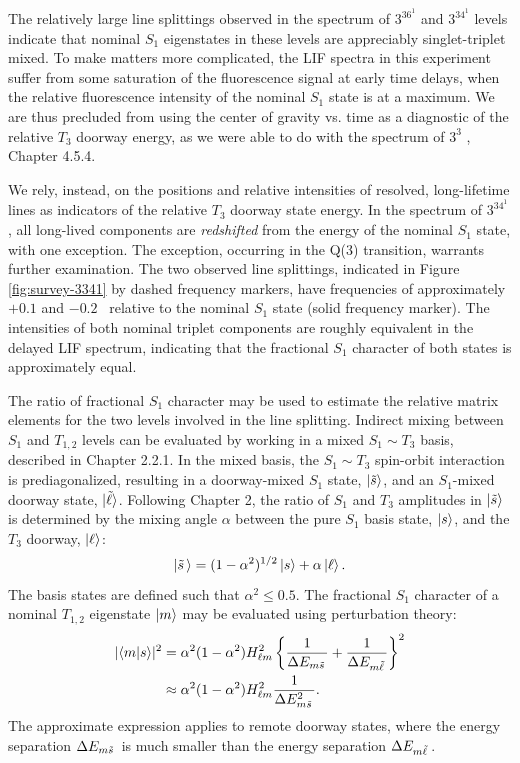 The relatively large line splittings observed in the spectrum of
$3^36^1$  and $3^34^1$  levels indicate that nominal $S_1$
eigenstates in these levels are appreciably singlet-triplet mixed.  To
make matters more complicated, the LIF spectra in this experiment
suffer from some saturation of the fluorescence signal at early time
delays, when the relative fluorescence intensity of the nominal $S_1$
state is at a maximum. We are thus precluded from using the center of
gravity vs. time as a diagnostic of the relative $T_3$ doorway energy,
as we were able to do with the spectrum of $3^3$ , Chapter
4.5.4.

We rely, instead, on the positions and relative intensities of
resolved, long-lifetime lines as indicators of the relative $T_3$
doorway state energy.  In the spectrum of $3^34^1$ , all
long-lived components are \emph{redshifted} from the energy of the
nominal $S_1$ state, with one exception.  The exception, occurring in
the Q(3) transition, warrants further examination.  The two observed
line splittings, indicated in Figure \ref{fig:survey-3341} by dashed
frequency markers, have frequencies of approximately $+0.1$ and $-0.2$
\rcm\ relative to the nominal $S_1$ state (solid frequency marker).
The intensities of both nominal triplet components are roughly
equivalent in the delayed LIF spectrum, indicating that the fractional
$S_1$ character of both states is approximately equal.

The ratio of fractional $S_1$ character may be used to estimate the
relative matrix elements for the two levels involved in the line
splitting.  Indirect mixing between $S_1$ and $T_{1,2}$ levels can be
evaluated by working in a mixed $S_1 \sim T_3$ basis, described in
Chapter 2.2.1.  In the mixed basis, the $S_1 \sim T_3$ spin-orbit
interaction is prediagonalized, resulting in a doorway-mixed $S_1$
state, $\mathinner{|{\tilde{s}}\rangle}$, and an $S_1$-mixed doorway state,
$\mathinner{|{\tilde{\ell}}\rangle}$.  Following Chapter 2, the ratio of $S_1$ and
$T_3$ amplitudes in $\mathinner{|{\tilde{s}}\rangle}$ is determined by the mixing
angle $\alpha$ between the pure $S_1$ basis state, $\mathinner{|{s}\rangle}$, and the
$T_3$ doorway, $\mathinner{|{\ell}\rangle}$:
\begin{equation}
  \mathinner{|{\tilde{s}\,}\rangle} = (1-\alpha^2)^{1/2} \mathinner{|{s}\rangle} + \alpha \mathinner{|{\ell}\rangle}.
\end{equation}
The basis states are defined such that $\alpha^2 \leq 0.5$.
The fractional $S_1$ character of a nominal $T_{1,2}$ eigenstate
$\mathinner{|{m}\rangle}$ may be evaluated using perturbation theory:
\begin{equation}
  \label{eq:s-char}
  \begin{split}
    \lvert \mathinner{\langle{m|s}\rangle} \rvert^2 
    &= \alpha^2 (1-\alpha^2) H_{\ell m}^2
    \left \lbrace 
      \frac{1}{\Delta E_{m \tilde{s}\,}} +
      \frac{1}{\Delta E_{m \tilde{\ell}\,}}
    \right \rbrace ^2\\
    &\approx \alpha^2 (1-\alpha^2) H_{\ell m}^2
    \frac{1}{\Delta E_{m \tilde{s}\,}^2}.
  \end{split}
\end{equation}
The approximate expression applies to remote doorway states, where the
energy separation $\Delta E_{m \tilde{s}\,}$ is much smaller than the energy
separation $\Delta E_{m \tilde{\ell}\,}$.  


